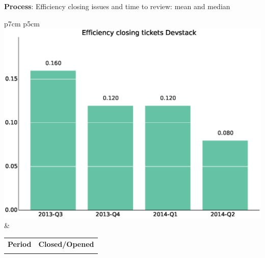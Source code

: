 \documentclass[a4wide,11pt]{report}
\begin{document}
\textbf{Process}: Efficiency closing issues and time to review: mean and median

\begin{tabular}{p{7cm} p{5cm}}
    \vspace{0pt} 
    \includegraphics[scale=.35]{figs/bmiDevstack.eps}
    & 
    \vspace{0pt}
    \begin{tabular}{l|l}%
    \bfseries Period & \bfseries Closed/Opened %
    \csvreader[head to column names]{data/bmiDevstack.csv}{}%
    {\\ & \bmi}
    \end{tabular}
\end{tabular}
\end{document}
